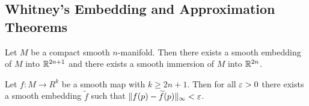 \documentclass[twoside, 10pt]{article}
\begin{document}
    \subsection{Whitney's Embedding and Approximation Theorems}%
    \label{sub:whitney_s_embedding_and_approximation_theorems}

    \begin{thm} Let $M$ be a compact smooth
    $n$-manifold. Then there exists a smooth embedding of $M$ into $\mathbb{R}^{2n+1}$
and there exists a smooth immersion of $M$ into $\mathbb{R}^{2n}$.  \end{thm}

    \begin{thm} Let $f:M \to R^k$ be a smooth
    map with $k \geq 2n+1$. Then for all $\varepsilon > 0$ there exists a smooth
embedding $\widetilde{f}$ such that $\lVert f(p) - \widetilde{f}(p)\rVert_{\infty} <
\varepsilon$.  \end{thm}
\end{document}
